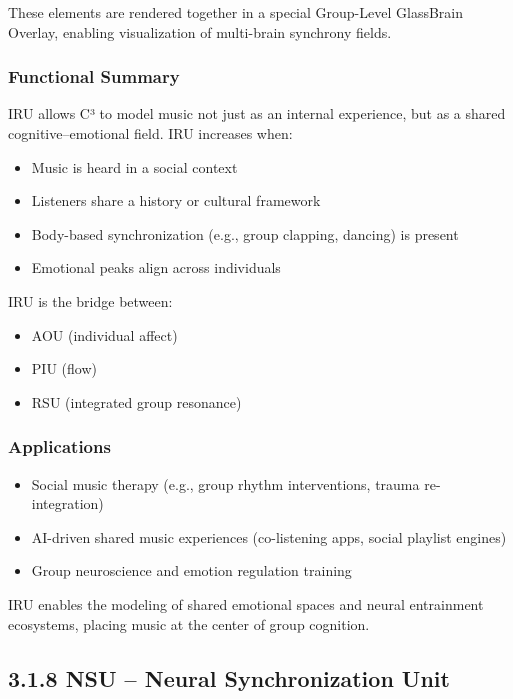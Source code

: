 These elements are rendered together in a special Group-Level GlassBrain Overlay, enabling visualization of multi-brain synchrony fields.

\subsubsection*{Functional Summary}

IRU allows C³ to model music not just as an internal experience, but as a shared cognitive–emotional field. IRU increases when:

\begin{itemize}
    \item Music is heard in a social context
    \item Listeners share a history or cultural framework
    \item Body-based synchronization (e.g., group clapping, dancing) is present
    \item Emotional peaks align across individuals
\end{itemize}

IRU is the bridge between:

\begin{itemize}
    \item AOU (individual affect)
    \item PIU (flow)
    \item RSU (integrated group resonance)
\end{itemize}

\subsubsection*{Applications}

\begin{itemize}
    \item Social music therapy (e.g., group rhythm interventions, trauma re-integration)
    \item AI-driven shared music experiences (co-listening apps, social playlist engines)
    \item Group neuroscience and emotion regulation training
\end{itemize}

IRU enables the modeling of shared emotional spaces and neural entrainment ecosystems, placing music at the center of group cognition.

\subsection*{3.1.8 NSU – Neural Synchronization Unit}

